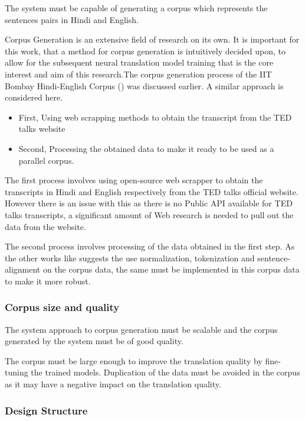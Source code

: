 The system must be capable of generating a corpus which represents the sentences pairs in Hindi and English. 

Corpus Generation is an extensive field of research on its own. It is important for this work, that a method for corpus generation is intuitively decided upon, to allow for the subsequent neural translation model training that is the core interest and aim of this research.The corpus generation process of the IIT Bombay Hindi-English Corpus (\cite{Kunchukuttan2018TheIB}) was discussed earlier. A similar approach is considered here.

\begin{itemize}
    \item First, Using web scrapping methods to obtain the transcript from the TED talks website
    \item Second, Processing the obtained data to make it ready to be used as a parallel corpus.
\end{itemize}

The first process involves using open-source web scrapper to obtain the transcripts in Hindi and English respectively from the TED talks official website. However there is an issue with this as there is no Public API available for TED talks transcripts, a significant amount of Web research is needed to pull out the data from the website.

The second process involves processing of the data obtained in the first step. As the other works like \cite{Kunchukuttan2018TheIB} suggests the use normalization, tokenization and sentence-alignment on the corpus data, the same must be implemented in this corpus data to make it more robust.

\subsubsection{Corpus size and quality}

The system approach to corpus generation must be scalable and the corpus generated by the system must be of good quality.

The corpus must be large enough to improve the translation quality by fine-tuning the trained models. Duplication of the data must be avoided in the corpus as it may have a negative impact on the translation quality.

\subsubsection{Design Structure}

